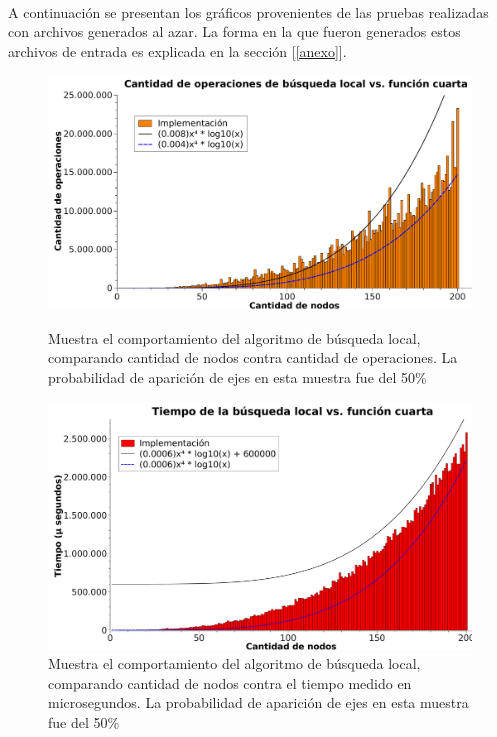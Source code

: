 \paragraph{}
A continuación se presentan los gráficos provenientes de las pruebas realizadas con archivos generados al azar. La forma en la que fueron generados estos archivos de entrada es explicada en la sección [\ref{anexo}].

\begin{figure}[htb]
    \begin{minipage}{\textwidth}
	\begin{center}
		\includegraphics[width=\textwidth]{./otros/graficos/operaciones_200nodos1_ej4.pdf}
		\caption{Muestra el comportamiento del algoritmo de búsqueda local, comparando cantidad de nodos contra cantidad de operaciones. La probabilidad de aparición de ejes en esta muestra fue del 50\%}
		\label{ej4contarOp}
	\end{center}
    \end{minipage}

\vspace*{0.5cm}

    \begin{minipage}{\textwidth}
	\begin{center}
		\includegraphics[width=\textwidth]{./otros/graficos/tiempo_200nodos1_ej4.pdf}
		\caption{Muestra el comportamiento del algoritmo de búsqueda local, comparando cantidad de nodos contra el tiempo medido en microsegundos. La probabilidad de aparición de ejes en esta muestra fue del 50\%}
		\label{ej4contarTiempo}
	\end{center}
    \end{minipage}

\end{figure}

